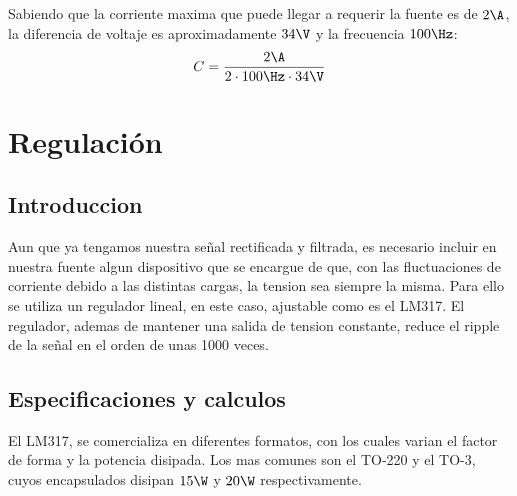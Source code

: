 \documentclass[chaptersright]{informeutn}
\begin{document}
        Sabiendo que la corriente maxima que puede llegar a requerir la fuente es de $2\A$, la diferencia de voltaje
        es aproximadamente $34\V$ y la frecuencia $100\Hz$:
        \begin{equation*}
          C = \frac{2\A}{2 \cdot 100\Hz \cdot 34\V}
        \end{equation*}
      
      \section{Regulación}
        \subsection{Introduccion}
          Aun que ya tengamos nuestra señal rectificada y filtrada, es necesario incluir en nuestra fuente algun
          dispositivo que se encargue de que, con las fluctuaciones de corriente debido a las distintas cargas, la
          tension sea siempre la misma. Para ello se utiliza un regulador lineal, en este caso, ajustable como es el
          LM317. El regulador, ademas de mantener una salida de tension constante, reduce el ripple de la señal en el
          orden de unas 1000 veces.
          
        \subsection{Especificaciones y calculos}
          El LM317, se comercializa en diferentes formatos, con los cuales varian el factor de forma y la potencia
          disipada. Los mas comunes son el TO-220 y el TO-3, cuyos encapsulados disipan $15\W$ y $20\W$ respectivamente.
\end{document}

